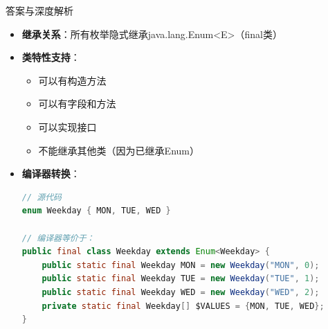 \documentclass[12pt, a4paper]{ctexart}
\begin{document}
\begin{enumerate}[label=\textbf{\arabic*.}]
\begin{bluebox}{答案与深度解析}
\begin{itemize}[leftmargin=*, nosep, label={}]
\begin{itemize}[label={}, leftmargin=*, nosep]
\begin{lstlisting}[language=Java]
// javap -c Color.class 结果：
public final class Color extends java.lang.Enum<Color> {
  public static final Color RED;
  public static final Color GREEN;
  public static final Color BLUE;
  // ...
}
				            \end{lstlisting}
				            \item \textbf{继承关系}：所有枚举隐式继承java.lang.Enum<E>（final类）
				            \item \textbf{类特性支持}：
				                  \begin{itemize}[label={}, nosep]
					                  \item 可以有构造方法
					                  \item 可以有字段和方法
					                  \item 可以实现接口
					                  \item 不能继承其他类（因为已继承Enum）
				                  \end{itemize}
				            \item \textbf{编译器转换}：
				                  \begin{lstlisting}[language=Java]
// 源代码
enum Weekday { MON, TUE, WED }

// 编译器等价于：
public final class Weekday extends Enum<Weekday> {
    public static final Weekday MON = new Weekday("MON", 0);
    public static final Weekday TUE = new Weekday("TUE", 1);
    public static final Weekday WED = new Weekday("WED", 2);
    private static final Weekday[] $VALUES = {MON, TUE, WED};
}
				            \end{lstlisting}
			            \end{itemize}


\end{itemize}
\end{bluebox}
\end{enumerate}
\end{document}
